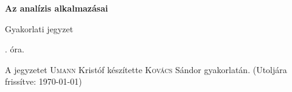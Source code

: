 \documentclass[a4paper,11.5pt]{article}
\begin{document}
	\setlength\parindent{0pt}
	\def\a{\textbf{a}}
	\def\b{\textbf{b}}
	\def\N{\hskip 10 true mm}
	\def\a{\textbf{a}}
	\def\b{\textbf{b}}
	\def\c{\textbf{c}}
	\def\d{\textbf{d}}
	\def\e{\textbf{e}}
	\def\gg{$\gamma$}
	\def\vi{\textbf{i}}
	\def\jj{\textbf{j}}
	\def\kk{\textbf{k}}
	\def\fh{\overrightarrow}
	\def\l{\lambda}
	\def\m{\mu}
	\def\v{\textbf{v}}
	\def\0{\textbf{0}}
	\def\s{\hspace{0.2mm}\vphantom{\beta}}
	\def\Z{\mathbb{Z}}
	\def\Q{\mathbb{Q}}
	\def\R{\mathbb{R}}
	\def\C{\mathbb{C}}
	\def\N{\mathbb{N}}
	\def\Rn{\mathbb{R}^{n}}
	\def\Ra{\overline{\mathbb{R}}}
	\def\sume{\displaystyle\sum_{n=1}^{+\infty}}
	\def\sumn{\displaystyle\sum_{n=0}^{+\infty}}
	\def\biz{\emph{Bizonyítás:\ }}
	\def\narrow{\underset{n\rightarrow+\infty}{\longrightarrow}}
	\def\limn{\displaystyle\lim_{n\to +\infty}}
	
	\theoremstyle{definition}
	\newtheorem{theorem}{Tétel}[subsubsection]
	
	\theoremstyle{definition}
	\newtheorem{definition}[theorem]{Definíció}
	\newtheorem{example}[theorem]{Példa}
	\newtheorem{exercise}[theorem]{Házi feladat}
	\newtheorem{note}[theorem]{Megjegyzés}
	\newtheorem{task}[theorem]{Feladat}
	\newtheorem{revision}[theorem]{Emlékeztető}
	\begin{center}
		{\LARGE\textbf{Az analízis alkalmazásai}}
		\smallskip

		{\Large Gyakorlati jegyzet}

		. óra.
	\end{center}
	A jegyzetet \textsc{Umann} Kristóf készítette \textsc{Kovács} Sándor gyakorlatán. (Utoljára frissítve: \today)
\end{document}
